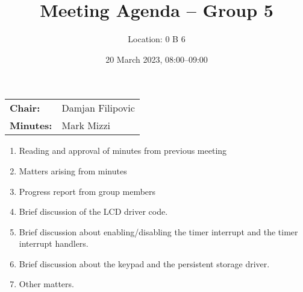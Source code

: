 \documentclass[11pt,a4paper]{scrartcl}
\title{Meeting Agenda -- Group 5}
\author{Location: 0 B 6}
\date{20 March 2023, 08:00--09:00}
\begin{document}
\maketitle
\begin{center}
\begin{tabular}{ll}
\textbf{Chair:}   & Damjan Filipovic \\
\textbf{Minutes:} & Mark Mizzi
\end{tabular}
\end{center}

\begin{enumerate}

\item Reading and approval of minutes from previous meeting

\item Matters arising from minutes

\item Progress report from group members

\item Brief discussion of the LCD driver code.

\item Brief discussion about enabling/disabling the timer interrupt and the timer interrupt handlers.

\item Brief discussion about the keypad and the persistent storage driver.

\item Other matters.

\end{enumerate}
\end{document}
